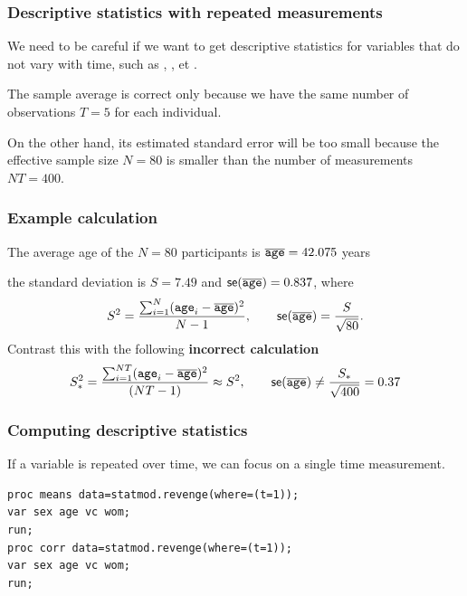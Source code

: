 \documentclass{beamer}
\begin{document}
\begin{frame}[fragile]
\frametitle{Descriptive statistics with repeated measurements}
 We need to be careful if we want to get descriptive statistics for variables that do not vary with time, such as , ,  et . 
\bi 
\item The sample average is correct only because we have the same number of observations $T=5$ for each individual.
\item On the other hand, its estimated standard error will be too small because the effective sample size $N=80$ is smaller than the number of measurements $NT=400$.
\ei
\end{frame}
\begin{frame}
\frametitle{Example calculation}
The average age of the $N=80$ participants is $\overline{\texttt{age}}= 42.075$ years
\bi
\item the standard deviation is $S=7.49$ and $\mathsf{se}(\overline{\texttt{age}})= 0.837$, where
\[S^2=\frac{\sum_{i=1}^N (\texttt{age}_i-\overline{\texttt{age}})^2}{N-1}, \qquad \mathsf{se}(\overline{\texttt{age}})=\frac{S}{\sqrt{80}}.\]
\ei
Contrast this with the following \textbf{incorrect calculation}
\[S^2_{*} = \frac{\sum_{i=1}^{NT} (\texttt{age}_i-\overline{\texttt{age}})^2}{(NT-1)} \approx S^2, \qquad \mathsf{se}(\overline{\texttt{age}}) \neq\frac{S_*}{\sqrt{400}} = 0.37 \]
\end{frame}
\begin{frame}[fragile]
\frametitle{Computing descriptive statistics}
If a variable is repeated over time, we can focus on a single time measurement.

\begin{tcolorbox}[colback=white, colframe=hecblue, title=\SASlang{} code to compute summary statistics]
\begin{small}
\begin{verbatim}
proc means data=statmod.revenge(where=(t=1)); 
var sex age vc wom; 
run; 
proc corr data=statmod.revenge(where=(t=1)); 
var sex age vc wom; 
run;
\end{verbatim}
\end{small}
\end{tcolorbox}

\end{frame}
% 
\end{document}
